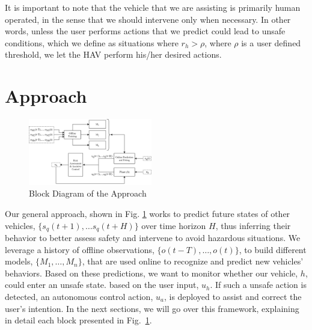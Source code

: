 \documentclass[letterpaper, 10 pt, conference]{ieeeconf}  %
\newcommand\NB[1]{$\spadesuit$\footnote{NB: #1}}
\begin{document}
    It is important to note that the vehicle that we are assisting is primarily human operated, in the sense that we should intervene only when necessary. %
    In other words, unless the user performs actions that we predict could lead to unsafe conditions, which we define as situations where $r_h>\rho$, where $\rho$ is a user defined threshold, we let the HAV perform his/her desired actions.

\section{Approach} \label{sec:approach}%
\begin{figure}[ht]
    \includegraphics[width=0.48\textwidth]{approach.png}
    \caption{Block Diagram of the Approach}
    \label{fig:app}
\end{figure}
Our general approach, shown in Fig. \ref{fig:app} works to predict future states of other vehicles, $\{s_q(t+1),\ldots s_q(t+H)\}$ over time horizon $H$, thus inferring their behavior to better assess safety and intervene to avoid hazardous situations. We leverage a history of offline observations, $\{o(t-T),\ldots,o(t)\}$, to build different models, $\{M_1,\ldots,M_n\}$, that are used online to recognize and predict new vehicles' behaviors. Based on these predictions, we want to monitor whether our vehicle, $h$, could enter an unsafe state.
 based on the user input, $u_h$. 
 If such a unsafe action is detected, an autonomous control action, $u_a$, is deployed to assist and correct the user's intention. In the next sections, we will go over this framework, explaining in detail each block presented in Fig.~\ref{fig:app}.
 

\end{document}
